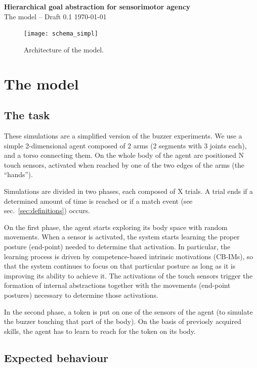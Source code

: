 \documentclass[11pt]{article}
\begin{document}
\begin{center} \huge{\bfseries{Hierarchical goal abstraction for sensorimotor
    agency}}\\ {The model -- Draft 0.1 \today}\\[3cm] \end{center}


\begin{figure}[H] \centering \texttt{[image: schema\_simpl]}
    \caption{Architecture of the model.} \label{fig:blueprint} \end{figure}

\section{The model}
\label{sec:model}

\subsection{The task}
\label{sec:task}

These simulations are a simplified version of the buzzer
experiments. We use a simple 2-dimensional agent composed of
2 arms (2 segments with 3 joints each), and a torso
connecting them. On the whole body of the agent are
positioned N touch sensors, activated when reached by one of
the two edges of the arms (the ``hands'').

Simulations are divided in two phases, each composed of X
trials. A trial ends if a determined amount of time is
reached or if a match event (see sec.~\ref{sec:definitions}) occurs. 

On the first phase, the agent starts exploring its body space
with random movements. When a sensor is activated, the
system starts learning the proper posture (end-point) needed
to determine that activation. In particular, the learning
process is driven by competence-based intrinsic motivations
(CB-IMs), so that the system continues to focus on that
particular posture as long as it is improving its ability to
achieve it. The activations of the touch sensors trigger the formation of
internal abstractions together with the movements (end-point
postures) necessary to determine those activations.

In the second phase, a token is put on one of the sensors of the
agent (to simulate the buzzer touching that part of the
body). On the basis of previosly acquired skills, the agent
has to learn to reach for the token on its body.

\subsection{Expected behaviour}
\label{sec:behaviour}
\end{document}
